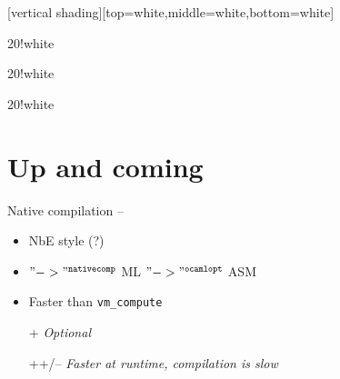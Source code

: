 [vertical shading][top=white,middle=white,bottom=white]

\def\bulletfail{\alert{\ding{54}}}
\def\bulletcheck{\ding{52}}



{\begin{colormixin}{20!white}{}\end{colormixin}\unskip}

{\begin{colormixin}{20!white}{}\end{colormixin}\unskip}

{\begin{colormixin}{20!white}{}\end{colormixin}\unskip}



\section{Up and coming}
\begin{subsecframe}{Native compilation -- }
\begin{itemize}
\item NbE style (?)
\item \Coq $"->"^{\texttt{nativecomp}}$ \textsc{ML} $"->"^{\texttt{ocamlopt}}$ \textsc{ASM}
\item Faster than \texttt{vm\_compute}
\end{itemize}

  \begin{itemize}
  \item[+] \emph{Optional}
  \item[++/--] \emph{Faster at runtime, compilation is slow}
  \end{itemize}
\end{subsecframe}

